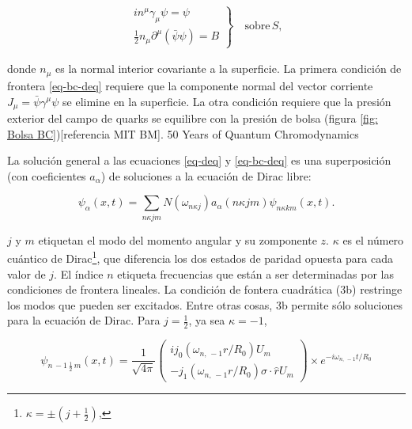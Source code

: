 \begin{eqnarray}\label{eq-bc-deq}
\left.
\begin{array}{c}
i {n}^{\mu} {\gamma}_{\mu} \psi = \psi \\ 
\frac{1}{2} {n}_{\mu} {\partial}^{\mu}(\bar{\psi} \psi) = B
\end{array} 
\right\rbrace  \quad \mathrm{sobre} \, S,
\end{eqnarray}

donde ${n}_{\mu}$ es la normal interior covariante a la superficie. La primera condición de frontera \eqref{eq-bc-deq} requiere que la componente normal del vector corriente ${J}_{\mu}=\bar{\psi}{\gamma}^{\mu}{\psi}$ se elimine en la superficie. La otra condición requiere que la presión exterior del campo de quarks se equilibre con la presión de bolsa (figura \ref{fig: Bolsa BC})[referencia MIT BM].
50 Years of Quantum Chromodynamics

La solución general a las ecuaciones \eqref{eq-deq} y \eqref{eq-bc-deq} es una superposición (con coeficientes ${a}_{\alpha}$) de soluciones a la ecuación de Dirac libre:

\begin{equation}
{\psi}_{\alpha}(x,t) = \sum_{n \kappa j m} N ({\omega}_{n \kappa j}) {a}_{\alpha} (n \kappa j m) {\psi}_{n \kappa k m} (x, t).
\end{equation}

$j$ y $m$ etiquetan el modo del momento angular y su zomponente $z$. $\kappa$ es el número cuántico de Dirac\footnote{$\kappa = \pm (j + \frac{1}{2})$,},  que diferencia los dos estados de paridad opuesta para cada valor de $j$.  El índice $n$ etiqueta frecuencias que están a ser determinadas por las condiciones de frontera lineales. La  condición de fontera cuadrática (3b) restringe los modos que pueden ser excitados. Entre otras cosas, 3b permite sólo soluciones para la ecuación de Dirac.
Para $j = \frac{1}{2}$, ya sea $\kappa = - 1$,

\begin{equation}\label{eq-deq-sol-k=-1}
{\psi}_{n \, -1 \, \frac{1}{2} \, m} (x,t) = \frac{1}{\sqrt{4 \pi}} 
\left( 
\begin{array}{c}
i {j}_{0} ({\omega}_{n, \, -1} r / {R}_{0}) {U}_{m} \\
- {j}_{1} ({\omega}_{n, \, -1} r / {R}_{0}) \sigma \cdot \hat{r}{U}_{m} 
\end{array}
\right) \times {e}^{- i {\omega}_{n, \, -1} t / {R}_{0}}
\end{equation}

